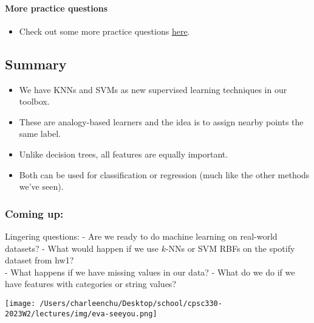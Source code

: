 \documentclass[11pt]{article}
\providecommand{\tightlist}{%
      \setlength{\itemsep}{0pt}\setlength{\parskip}{0pt}}
\begin{document}
    \paragraph{More practice questions}\label{more-practice-questions}

\begin{itemize}
\tightlist
\item
  Check out some more practice questions
  \href{https://ml-learn.mds.ubc.ca/en/module4}{here}.
\end{itemize}

    \subsection{Summary}\label{summary}

\begin{itemize}
\tightlist
\item
  We have KNNs and SVMs as new supervised learning techniques in our
  toolbox.
\item
  These are analogy-based learners and the idea is to assign nearby
  points the same label.
\item
  Unlike decision trees, all features are equally important.
\item
  Both can be used for classification or regression (much like the other
  methods we've seen).
\end{itemize}

    \subsubsection{Coming up:}\label{coming-up}

Lingering questions: - Are we ready to do machine learning on real-world
datasets? - What would happen if we use \(k\)-NNs or SVM RBFs on the
spotify dataset from hw1?\\
- What happens if we have missing values in our data? - What do we do if
we have features with categories or string values?

    \texttt{[image: /Users/charleenchu/Desktop/school/cpsc330-2023W2/lectures/img/eva-seeyou.png]}


    
    
    
\end{document}
